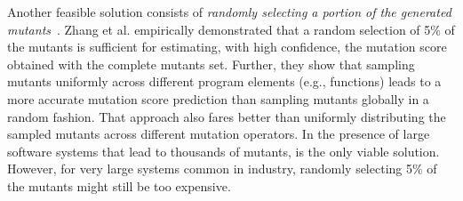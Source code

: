 Another feasible solution consists of  \emph{randomly selecting a portion of the generated mutants}~\cite{zhang2010operator,gopinath2015hard,zhang2013operator}.
%
%
%
Zhang et al. \cite{zhang2013operator} empirically demonstrated that a random selection of 5\% of the mutants is sufficient for
estimating, with high confidence, the mutation score obtained with the complete mutants set.
Further,
they show that sampling mutants uniformly across different program elements (e.g., functions) %
leads to a more accurate mutation score prediction than sampling mutants globally in a random fashion. That approach also fares better than uniformly distributing the sampled mutants across different mutation operators. In the presence of large software systems that lead to thousands of mutants,  is the only viable solution. However, for very large systems common in industry, randomly selecting 5\% of the mutants might still be too expensive.

